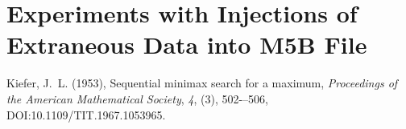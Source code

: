 \documentclass[letterpaper,twoside,12pt]{article}
\begin{document}
\section{Experiments with Injections of Extraneous Data into M5B File}










\begin{thebibliography}{99}

{Kiefer}, J.~L. (1953), {Sequential minimax search for a maximum}, \textit{Proceedings of the American Mathematical Society}, \textit{4}, (3), 502-–506, DOI:10.1109/TIT.1967.1053965.

%
%
%
%
%
%
%
%
%
%


\end{thebibliography}
\end{document}
